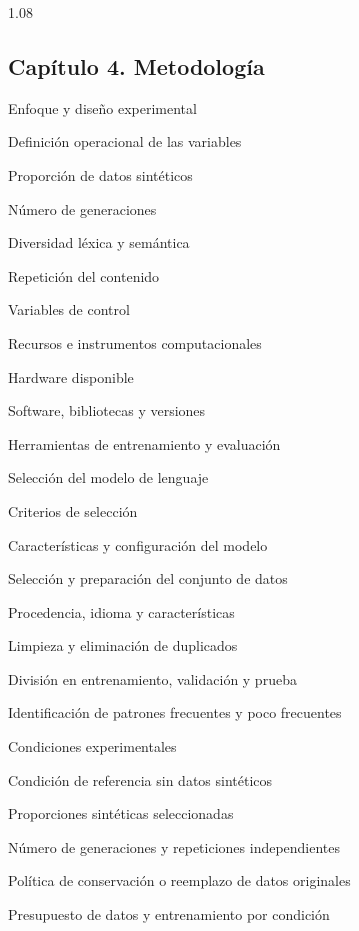 \documentclass[12pt,letterpaper]{article}
\newcommand{\numerocap}{1}
\newcommand{\capitulo}[2]{\renewcommand{\numerocap}{#1}\Needspace{5\baselineskip}\subsection*{Capítulo #1. #2}}
\begin{document}
\begin{spacing}{1.08}
\capitulo{4}{Metodología}
\begin{apartados}
\item Enfoque y diseño experimental
\item Definición operacional de las variables
\begin{apartados}
\item Proporción de datos sintéticos
\item Número de generaciones
\item Diversidad léxica y semántica
\item Repetición del contenido
\item Variables de control
\end{apartados}
\item Recursos e instrumentos computacionales
\begin{apartados}
\item Hardware disponible
\item Software, bibliotecas y versiones
\item Herramientas de entrenamiento y evaluación
\end{apartados}
\item Selección del modelo de lenguaje
\begin{apartados}
\item Criterios de selección
\item Características y configuración del modelo
\end{apartados}
\item Selección y preparación del conjunto de datos
\begin{apartados}
\item Procedencia, idioma y características
\item Limpieza y eliminación de duplicados
\item División en entrenamiento, validación y prueba
\item Identificación de patrones frecuentes y poco frecuentes
\end{apartados}
\item Condiciones experimentales
\begin{apartados}
\item Condición de referencia sin datos sintéticos
\item Proporciones sintéticas seleccionadas
\item Número de generaciones y repeticiones independientes
\item Política de conservación o reemplazo de datos originales
\item Presupuesto de datos y entrenamiento por condición

\end{apartados}
\end{apartados}
\end{spacing}
\end{document}
